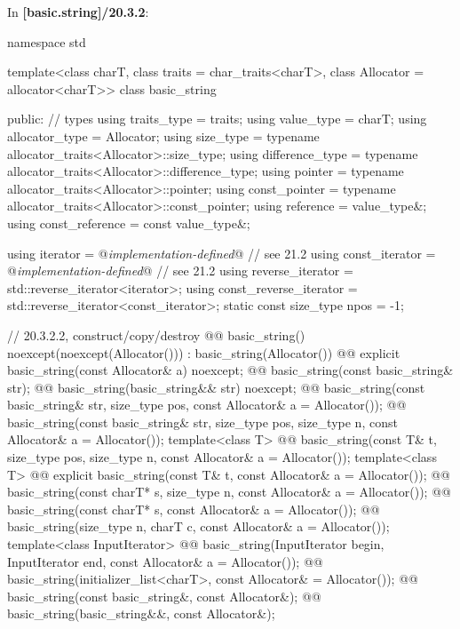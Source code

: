 \documentclass{wg21}
\begin{document}
In \textbf{[basic.string]/20.3.2}:
\begin{codeblock}
namespace std {
  template<class charT, class traits = char_traits<charT>,
           class Allocator = allocator<charT>>
  class basic_string {
  public:
    // types
    using traits_type            = traits;
    using value_type             = charT;
    using allocator_type         = Allocator;
    using size_type              = typename allocator_traits<Allocator>::size_type;
    using difference_type        = typename allocator_traits<Allocator>::difference_type;
    using pointer                = typename allocator_traits<Allocator>::pointer;
    using const_pointer          = typename allocator_traits<Allocator>::const_pointer;
    using reference              = value_type&;
    using const_reference        = const value_type&;

    using iterator               = @\textit{implementation-defined}@ // see 21.2
    using const_iterator         = @\textit{implementation-defined}@ // see 21.2
    using reverse_iterator       = std::reverse_iterator<iterator>;
    using const_reverse_iterator = std::reverse_iterator<const_iterator>;
    static const size_type npos  = -1;

    // 20.3.2.2, construct/copy/destroy
    @@ basic_string() noexcept(noexcept(Allocator())) : basic_string(Allocator()) { }
    @@ explicit basic_string(const Allocator& a) noexcept;
    @@ basic_string(const basic_string& str);
    @@ basic_string(basic_string&& str) noexcept;
    @@ basic_string(const basic_string& str, size_type pos, const Allocator& a = Allocator());
    @@ basic_string(const basic_string& str, size_type pos, size_type n,
                                     const Allocator& a = Allocator());
    template<class T>
      @@ basic_string(const T& t, size_type pos, size_type n, const Allocator& a = Allocator());
    template<class T>
      @@ explicit basic_string(const T& t, const Allocator& a = Allocator());
    @@ basic_string(const charT* s, size_type n, const Allocator& a = Allocator());
    @@ basic_string(const charT* s, const Allocator& a = Allocator());
    @@ basic_string(size_type n, charT c, const Allocator& a = Allocator());
    template<class InputIterator>
      @@ basic_string(InputIterator begin, InputIterator end, const Allocator& a = Allocator());
    @@ basic_string(initializer_list<charT>, const Allocator& = Allocator());
    @@ basic_string(const basic_string&, const Allocator&);
    @@ basic_string(basic_string&&, const Allocator&);

}}
\end{codeblock}
\end{document}
